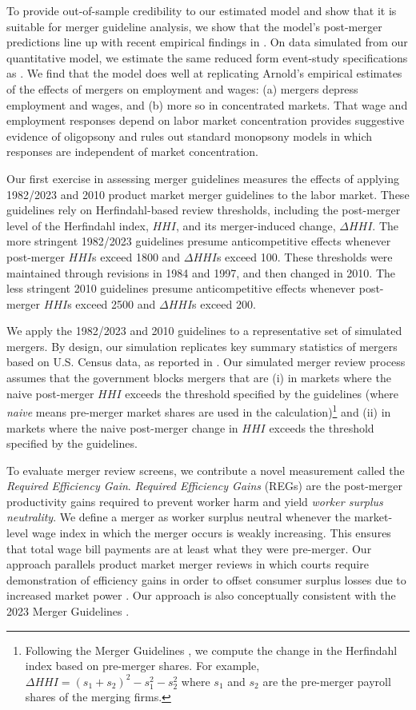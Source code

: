 \documentclass[12pt]{article}
\theoremstyle{prop}
\begin{document}
To provide out-of-sample credibility to our estimated model and show that it is suitable for merger guideline analysis, we show that the model's post-merger predictions line up with recent empirical findings in \citet{Arnold}. 
On data simulated from our quantitative model, we estimate the same reduced form event-study specifications as \citet{Arnold}. 
We find that the model does well at replicating Arnold's empirical estimates of the effects of mergers on employment and wages: 
(a) mergers depress employment and wages, and (b) more so in concentrated markets. 
That wage and employment responses depend on labor market concentration provides suggestive evidence of oligopsony and rules out standard monopsony models in which responses are independent of market concentration. 
 
Our first exercise in assessing merger guidelines measures the effects of applying 1982/2023 and 2010 product market merger guidelines to the labor market. 
These guidelines rely on Herfindahl-based review thresholds, including the post-merger level of the Herfindahl index, $HHI$, and its merger-induced change, $\Delta HHI$.
The more stringent 1982/2023 guidelines presume anticompetitive effects whenever post-merger $HHI$s exceed 1800 and $\Delta HHI$s exceed 100. 
These thresholds were maintained through revisions in 1984 and 1997, and then changed in 2010.
The less stringent 2010 guidelines presume anticompetitive effects whenever post-merger $HHI$s exceed 2500 and $\Delta HHI$s exceed 200. 
 

We apply the 1982/2023 and 2010 guidelines to a representative set of simulated mergers.
By design, our simulation replicates key summary statistics of mergers based on U.S. Census data, as reported in \citet{Arnold}.  
Our simulated merger review process assumes that the government blocks mergers that are (i) in markets where the naive post-merger $HHI$ exceeds the threshold specified by the guidelines (where \textit{naive} means pre-merger market shares are used in the calculation)\footnote{
    Following the Merger Guidelines \citet{doj2010guidelines}, we compute the change in the Herfindahl index based on pre-merger shares. For example, $\Delta HHI=(s_1+s_2)^2-s_1^2-s_2^2$ where $s_1$ and $s_2$ are the pre-merger payroll shares of the merging firms.} and (ii)  in markets where the naive post-merger change in $HHI$ exceeds the threshold specified by the guidelines. 


To evaluate merger review screens, we contribute a novel measurement called the \emph{Required Efficiency Gain}.
\textit{Required Efficiency Gains} (REGs) are the post-merger productivity gains required to prevent worker harm and yield \emph{worker surplus neutrality}. 
We define a merger as worker surplus neutral whenever the market-level wage index in which the merger occurs is weakly increasing. 
This ensures that total wage bill payments are at least what they were pre-merger. 
Our approach parallels product market merger reviews in which courts require demonstration of efficiency gains in order to offset consumer surplus losses due to increased market power \citep{pittman2007consumer}.
Our approach is also conceptually consistent with the 2023 Merger Guidelines \citep{berger2023comments}.
\end{document}
